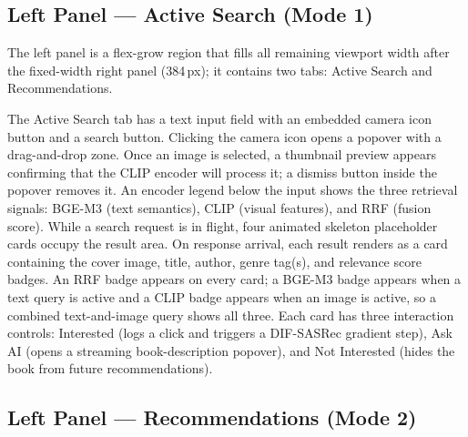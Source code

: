 \subsection{Left Panel --- Active Search (Mode 1)}
\label{sec:app_search_panel}

The left panel is a flex-grow region that fills all remaining viewport width after the fixed-width right panel (384\,px); it contains two tabs: Active Search and Recommendations.

The Active Search tab has a text input field with an embedded camera icon button and a search button.
Clicking the camera icon opens a popover with a drag-and-drop zone. Once an image is selected, a thumbnail preview appears confirming that the CLIP encoder will process it; a dismiss button inside the popover removes it.
An encoder legend below the input shows the three retrieval signals: BGE-M3 (text semantics), CLIP (visual features), and RRF (fusion score).
While a search request is in flight, four animated skeleton placeholder cards occupy the result area.
On response arrival, each result renders as a card containing the cover image, title, author, genre tag(s), and relevance score badges.
An RRF badge appears on every card; a BGE-M3 badge appears when a text query is active and a CLIP badge appears when an image is active, so a combined text-and-image query shows all three.
Each card has three interaction controls: Interested (logs a click and triggers a DIF-SASRec gradient step), Ask AI (opens a streaming book-description popover), and Not Interested (hides the book from future recommendations).

\subsection{Left Panel --- Recommendations (Mode 2)}
\label{sec:app_rec_panel}

